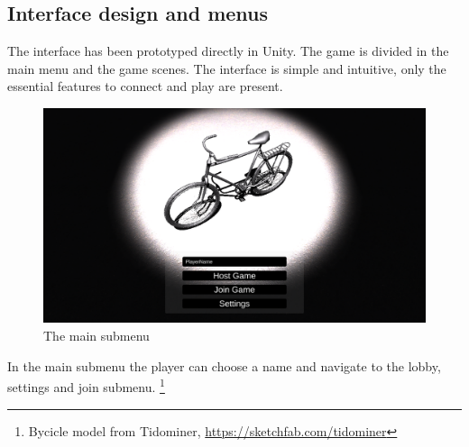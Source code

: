\documentclass[12pt]{article}
\begin{document}
\clearpage

\subsection{Interface design and menus}
The interface has been prototyped directly in Unity. The game is divided in the main menu and the game scenes. The interface is simple and intuitive, only the essential features to connect and play are present. 
\begin{figure}[H]
\includegraphics[width=\textwidth]{splash}
\caption{The main submenu}
\end{figure}
In the main submenu the player can choose a name and navigate to the lobby, settings and join submenu. \footnote{Bycicle model from Tidominer, \url{https://sketchfab.com/tidominer}}
\end{document}
